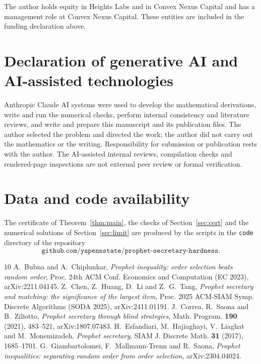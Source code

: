 \documentclass[11pt]{amsart}
\theoremstyle{remark}\newtheorem{remark}[theorem]{Remark}
\begin{document}
The author holds equity in Heights Labs and in Convex Nexus Capital and has a management role at Convex Nexus Capital. These entities are included in the funding declaration above.

\section*{Declaration of generative AI and AI-assisted technologies}

Anthropic Claude AI systems were used to develop the mathematical derivations, write and run the numerical checks, perform internal consistency and literature reviews, and write and prepare this manuscript and its publication files. The author selected the problem and directed the work; the author did not carry out the mathematics or the writing. Responsibility for submission or publication rests with the author. The AI-assisted internal reviews, compilation checks and rendered-page inspections are not external peer review or formal verification.

\section*{Data and code availability}

The certificate of Theorem~\ref{thm:main}, the checks of Section~\ref{sec:cert} and the numerical solutions of
Section~\ref{sec:limit} are produced by the scripts in the \texttt{code} directory of the repository
\[
\texttt{github.com/yspennstate/prophet-secretary-hardness}.
\]

\begin{thebibliography}{10}
 A.~Bubna and A.~Chiplunkar, \emph{Prophet inequality: order selection beats random order}, Proc. 24th ACM
Conf. Economics and Computation (EC 2023), arXiv:2211.04145.
 Z.~Chen, Z.~Huang, D.~Li and Z.~G.~Tang, \emph{Prophet secretary and matching: the significance of the
largest item}, Proc. 2025 ACM-SIAM Symp. Discrete Algorithms (SODA 2025), arXiv:2411.01191.
 J.~Correa, R.~Saona and B.~Ziliotto, \emph{Prophet secretary through blind strategies}, Math. Program.
\textbf{190} (2021), 483--521, arXiv:1807.07483.
 H.~Esfandiari, M.~Hajiaghayi, V.~Liaghat and M.~Monemizadeh, \emph{Prophet secretary}, SIAM J. Discrete
Math. \textbf{31} (2017), 1685--1701.
 G.~Giambartolomei, F.~Mallmann-Trenn and R.~Saona, \emph{Prophet inequalities: separating random order
from order selection}, arXiv:2304.04024.
\end{thebibliography}
\end{document}
